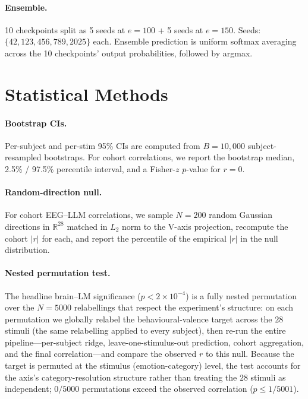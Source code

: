 \paragraph{Ensemble.} 10 checkpoints split as 5 seeds at $e=100$ + 5
seeds at $e=150$. Seeds: $\{42, 123, 456, 789, 2025\}$ each. Ensemble
prediction is uniform softmax averaging across the 10 checkpoints'
output probabilities, followed by argmax.


\section{Statistical Methods}
\label{app:statistics}

\paragraph{Bootstrap CIs.} Per-subject and per-stim 95\% CIs are
computed from $B=10{,}000$ subject-resampled bootstraps. For cohort
correlations, we report the bootstrap median, 2.5\% / 97.5\% percentile
interval, and a Fisher-$z$ $p$-value for $r=0$.

\paragraph{Random-direction null.} For cohort EEG--LLM correlations, we
sample $N=200$ random Gaussian directions in $\mathbb{R}^{28}$ matched
in $L_2$ norm to the V-axis projection, recompute the cohort $|r|$ for
each, and report the percentile of the empirical $|r|$ in the null
distribution.

\paragraph{Nested permutation test.} The headline brain--LM
significance ($p<2{\times}10^{-4}$) is a fully nested permutation over
the $N=5000$ relabellings that respect the experiment's structure: on
each permutation we globally relabel the behavioural-valence target
across the $28$ stimuli (the same relabelling applied to every
subject), then re-run the entire pipeline---per-subject ridge,
leave-one-stimulus-out prediction, cohort aggregation, and the final
correlation---and compare the observed $r$ to this null. Because the
target is permuted at the stimulus (emotion-category) level, the test
accounts for the axis's category-resolution structure rather than
treating the $28$ stimuli as independent; $0/5000$ permutations exceed
the observed correlation ($p\le 1/5001$).

